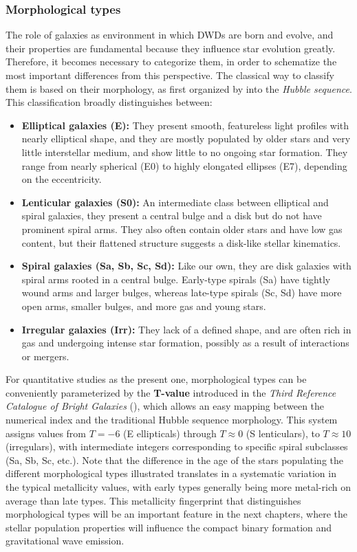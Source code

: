 \subsubsection{Morphological types}
The role of galaxies as environment in which DWDs are born and evolve, and their properties are fundamental because they influence star evolution greatly.
Therefore, it becomes necessary to categorize them, in order to schematize the most important differences from this perspective.
The classical way to classify them is based on their morphology, as first organized by \citet{Hubble1926} into the \textit{Hubble sequence}.  
This classification broadly distinguishes between:
\begin{itemize}
    \item \textbf{Elliptical galaxies (E):} They present smooth, featureless light profiles with nearly elliptical shape, and they are mostly populated by older stars and very little interstellar medium, and show little to no ongoing star formation. 
    They range from nearly spherical (E0) to highly elongated ellipses (E7), depending on the eccentricity. 
    \item \textbf{Lenticular galaxies (S0):} An intermediate class between elliptical and spiral galaxies, they present a central bulge and a disk but do not have prominent spiral arms.
    They also often contain older stars and have low gas content, but their flattened structure suggests a disk-like stellar kinematics.
    \item \textbf{Spiral galaxies (Sa, Sb, Sc, Sd):} Like our own, they are disk galaxies with spiral arms rooted in a central bulge.
    Early-type spirals (Sa) have tightly wound arms and larger bulges, whereas late-type spirals (Sc, Sd) have more open arms, smaller bulges, and more gas and young stars.
    \item \textbf{Irregular galaxies (Irr):} They lack of a defined shape, and are often rich in gas and undergoing intense star formation, possibly as a result of interactions or mergers.
\end{itemize}
For quantitative studies as the present one, morphological types can be conveniently parameterized by the \textbf{T-value} introduced in the \textit{Third Reference Catalogue of Bright Galaxies} (\citealt{Vaculeurs}), which allows an easy mapping between the numerical index and the traditional Hubble sequence morphology.
This system assigns values from $T=-6$ (E ellipticals) through $T\approx 0$ (S lenticulars), to $T\approx 10$ (irregulars), with intermediate integers corresponding to specific spiral subclasses (Sa, Sb, Sc, etc.).  
Note that the difference in the age of the stars populating the different morphological types illustrated translates in a systematic variation in the typical metallicity values, with early types generally being more metal-rich on average than late types. 
This metallicity fingerprint that distinguishes morphological types will be an important feature in the next chapters, where the stellar population properties will influence the compact binary formation and gravitational wave emission.

